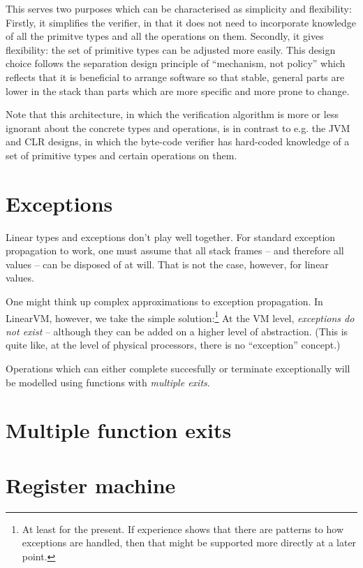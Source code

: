 \documentclass[a4paper]{book}
\begin{document}
This serves two purposes which can be characterised as simplicity and flexibility:
Firstly, it simplifies the verifier, in that it does not need to incorporate
knowledge of all the primitve types and all the operations on them.
Secondly, it gives flexibility: the set of primitive types can be adjusted
more easily.
This design choice follows the separation design principle of ``mechanism,
not policy'' which reflects that it is beneficial to arrange software so
that stable, general parts are lower in the stack than parts which are
more specific and more prone to change.

Note that this architecture, in which the verification algorithm is
more or less ignorant about the concrete types and operations,
is in contrast to e.g. the JVM and CLR designs, in which the
byte-code verifier has hard-coded knowledge of a set of primitive types
and certain operations on them.

\section{Exceptions}

Linear types and exceptions don't play well together.
For standard exception propagation to work, one must assume that
all stack frames -- and therefore all values -- can be disposed of at will.
That is not the case, however, for linear values.

One might think up complex approximations to exception propagation.
In LinearVM, however, we take the simple solution:\footnote{
At least for the present. If experience shows that there are patterns to how exceptions are handled, then that might be supported more directly at a later point.}
At the VM level, \emph{exceptions do not exist} -- although they can be added on
a higher level of abstraction.
(This is quite like, at the level of physical processors, there is no
``exception'' concept.)

Operations which can either complete succesfully or terminate exceptionally
will be modelled using functions with \emph{multiple exits}.

\section{Multiple function exits}

\section{Register machine}
\end{document}
